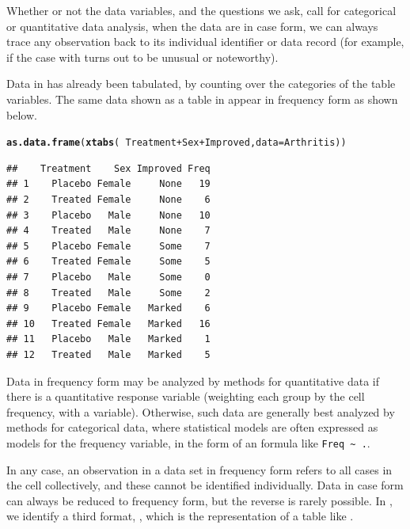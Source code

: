 \documentclass[11pt]{book}\usepackage[]{graphicx}\usepackage[]{color}
\makeatletter
\newcommand{\hlopt}[1]{\textcolor[rgb]{0,0,0}{#1}}%
\newcommand{\hlstd}[1]{\textcolor[rgb]{0.345,0.345,0.345}{#1}}%
\newcommand{\hlkwc}[1]{\textcolor[rgb]{0.333,0.667,0.333}{#1}}%
\newcommand{\hlkwd}[1]{\textcolor[rgb]{0.737,0.353,0.396}{\textbf{#1}}}%
\newenvironment{kframe}{%
 \def\at@end@of@kframe{}%
 \ifinner\ifhmode%
  \def\at@end@of@kframe{\end{minipage}}%
  \begin{minipage}{\columnwidth}%
 \fi\fi%
 \def\FrameCommand##1{\hskip\@totalleftmargin \hskip-\fboxsep
 \colorbox{shadecolor}{##1}\hskip-\fboxsep
     \hskip-\linewidth \hskip-\@totalleftmargin \hskip\columnwidth}%
 \MakeFramed {\advance\hsize-\width
   \@totalleftmargin\z@ \linewidth\hsize
   \@setminipage}}%
 {\par\unskip\endMakeFramed%
 \at@end@of@kframe}
\newenvironment{knitrout}{}{} %
\renewenvironment{knitrout}{\small\renewcommand{\baselinestretch}{.85}}{} %
\makeatother
\begin{document}
Whether or not the data variables, and the questions we ask, call for
categorical or quantitative data analysis, 
when the data are in case form,
we can always trace
any observation back to its individual identifier or data record
(for example, if the case with  turns out to be unusual
or noteworthy).

Data in  
has already been tabulated, by counting over the categories of the
table variables. The same data shown as a table in 
 appear in frequency form as shown below.
\begin{knitrout}
\color{fgcolor}\begin{kframe}
\begin{alltt}
\hlkwd{as.data.frame}\hlstd{(}\hlkwd{xtabs}\hlstd{(}\hlopt{~}\hlstd{Treatment}\hlopt{+}\hlstd{Sex}\hlopt{+}\hlstd{Improved,} \hlkwc{data}\hlstd{=Arthritis))}
\end{alltt}
\begin{verbatim}
##    Treatment    Sex Improved Freq
## 1    Placebo Female     None   19
## 2    Treated Female     None    6
## 3    Placebo   Male     None   10
## 4    Treated   Male     None    7
## 5    Placebo Female     Some    7
## 6    Treated Female     Some    5
## 7    Placebo   Male     Some    0
## 8    Treated   Male     Some    2
## 9    Placebo Female   Marked    6
## 10   Treated Female   Marked   16
## 11   Placebo   Male   Marked    1
## 12   Treated   Male   Marked    5
\end{verbatim}
\end{kframe}
\end{knitrout}


Data in frequency form may be analyzed by methods
for quantitative data if there is a quantitative response variable
(weighting each group by the cell frequency, with a 
variable).  
Otherwise, such data are generally
best analyzed by methods for categorical data, where
statistical models are often expressed as models for the
frequency variable, in the form of an \R formula
like \verb|Freq ~ .|.

In any case, an observation in a data set in
frequency form refers
to all cases in the cell collectively, and these cannot be identified individually.
Data in case form can always be reduced to frequency form,
but the reverse is rarely possible. In ,
we identify a third format, , which is the
\R representation of a table like .
\end{document}
